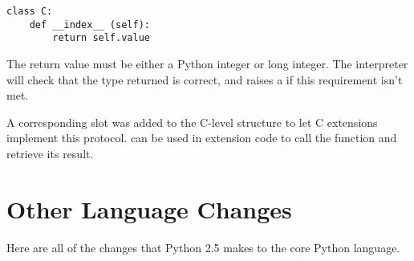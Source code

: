 \documentclass{howto}
\begin{document}
\begin{verbatim}
class C:
    def __index__ (self):
        return self.value  
\end{verbatim}

The return value must be either a Python integer or long integer.
The interpreter will check that the type returned is correct, and
raises a  if this requirement isn't met.

A corresponding  slot was added to the C-level
 structure to let C extensions implement this
protocol.   can be used in
extension code to call the  function and retrieve
its result.

\begin{seealso}


\end{seealso}


\section{Other Language Changes\label{other-lang}}

Here are all of the changes that Python 2.5 makes to the core Python
language.
\end{document}
